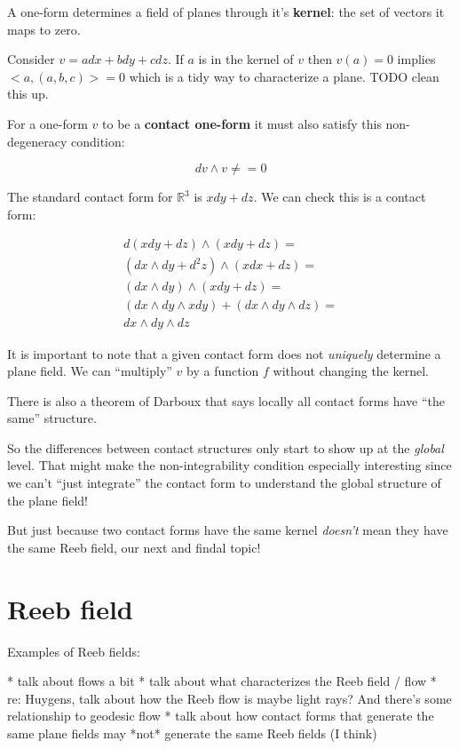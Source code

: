 \documentclass{article}
\begin{document}
A one-form determines a field of planes through it's \textbf{kernel}: the set of
vectors it maps to zero.

Consider $v = a dx + b dy + c dz$. If $a$ is in the kernel of $v$ then $v(a) =
0$ implies $<a, (a, b, c)> = 0$ which is a tidy way to characterize a plane.
TODO clean this up.

For a one-form $v$ to be a \textbf{contact one-form} it must also satisfy this
non-degeneracy condition:

\begin{equation}
  dv \wedge v \neq = 0
\end{equation}

The standard contact form for $\mathbb{R}^{3}$ is $xdy + dz$. We can check this
is a contact form:

\begin{align*}
  d (xdy + dz) \wedge (xdy + dz) = \\
  (dx \wedge dy + d^{2} z) \wedge (xdx + dz) = \\
  (dx \wedge dy) \wedge (xdy + dz) = \\
  (dx \wedge dy \wedge xdy) + (dx \wedge dy \wedge dz) = \\
  dx \wedge dy \wedge dz
\end{align*}

It is important to note that a given contact form does not \textit{uniquely}
determine a plane field. We can ``multiply'' $v$ by a function $f$ without
changing the kernel.

There is also a theorem of Darboux that says locally all contact forms have
``the same'' structure.

So the differences between contact structures only start to show up at the
\textit{global} level. That might make the non-integrability condition
especially interesting since we can't ``just integrate'' the contact form to understand
the global structure of the plane field!

But just because two contact forms have the same kernel \textit{doesn't} mean
they have the same Reeb field, our next and findal topic!

\section {Reeb field}
  
Examples of Reeb fields:

* talk about flows a bit
* talk about what characterizes the Reeb field / flow
* re: Huygens, talk about how the Reeb flow is maybe light rays? And there's
some relationship to geodesic flow
* talk about how contact forms that generate the same plane fields may *not*
generate the same Reeb fields (I think)
\end{document}
